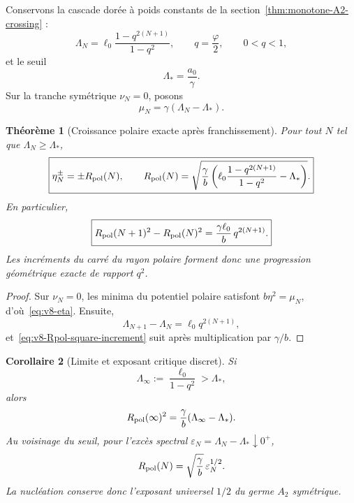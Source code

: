 \documentclass[11pt,a4paper]{article}
\newtheorem{theorem}{Théorème}[section]
\newtheorem{corollary}[theorem]{Corollaire}
\begin{document}
Conservons la cascade dorée à poids constants de la section~\ref{thm:monotone-A2-crossing} :
\begin{equation}\label{eq:v8-LambdaN}
 \Lambda_N
 =\ell_0\frac{1-q^{2(N+1)}}{1-q^2},
 \qquad
 q=\frac{\varphi}{2},
 \qquad
 0<q<1,
\end{equation}
et le seuil
\[
 \Lambda_*=\frac{a_0}{\gamma}.
\]
Sur la tranche symétrique $\nu_N=0$, posons
\begin{equation}\label{eq:v8-muN}
 \mu_N=\gamma(\Lambda_N-\Lambda_*).
\end{equation}

\begin{theorem}[Croissance polaire exacte après franchissement]\label{thm:v8-polar-growth}
Pour tout $N$ tel que $\Lambda_N\ge\Lambda_*$,
\begin{equation}\label{eq:v8-eta}
 \boxed{
 \eta_N^\pm
 =\pm R_{\rm pol}(N),
 \qquad
 R_{\rm pol}(N)
 =\sqrt{
 \frac{\gamma}{b}
 \left(
 \ell_0\frac{1-q^{2(N+1)}}{1-q^2}-\Lambda_*
 \right)}.}
\end{equation}
En particulier,
\begin{equation}\label{eq:v8-Rpol-square-increment}
 \boxed{
 R_{\rm pol}(N+1)^2-R_{\rm pol}(N)^2
 =\frac{\gamma\ell_0}{b}\,q^{2(N+1)}.}
\end{equation}
Les incréments du carré du rayon polaire forment donc une progression géométrique exacte de rapport $q^2$.
\end{theorem}

\begin{proof}
Sur $\nu_N=0$, les minima du potentiel polaire satisfont
$b\eta^2=\mu_N$, d'où~\eqref{eq:v8-eta}. Ensuite,
\[
 \Lambda_{N+1}-\Lambda_N=\ell_0q^{2(N+1)},
\]
et~\eqref{eq:v8-Rpol-square-increment} suit après multiplication par $\gamma/b$.
\end{proof}

\begin{corollary}[Limite et exposant critique discret]\label{cor:v8-critical-exponent}
Si
\[
 \Lambda_\infty:=\frac{\ell_0}{1-q^2}>\Lambda_*,
\]
alors
\begin{equation}\label{eq:v8-Rpol-limit}
 R_{\rm pol}(\infty)^2
 =\frac{\gamma}{b}(\Lambda_\infty-\Lambda_*).
\end{equation}
Au voisinage du seuil, pour l'excès spectral
$\varepsilon_N=\Lambda_N-\Lambda_*\downarrow0^+$,
\begin{equation}\label{eq:v8-square-root-law}
 R_{\rm pol}(N)=\sqrt{\frac{\gamma}{b}}\,\varepsilon_N^{1/2}.
\end{equation}
La nucléation conserve donc l'exposant universel $1/2$ du germe $A_2$ symétrique.
\end{corollary}
\end{document}
